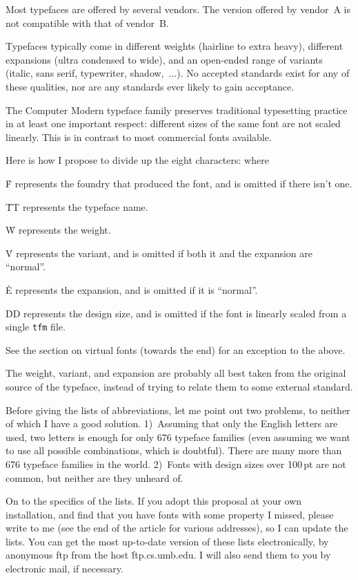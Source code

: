 {\mitem Most typefaces are offered by several vendors.  The version
offered by vendor~A is not compatible with that of vendor~B.

\mitem Typefaces typically come in different weights (hairline to extra
heavy), different expansions (ultra condensed to wide), and an
open-ended range of variants (italic, sans serif, typewriter,
shadow,~$\ldots$).  No accepted standards exist for any of these
qualities, nor are any standards ever likely to gain acceptance.

\mitem The Computer Modern typeface family preserves traditional typesetting
practice in at least one important respect: different sizes of the same
font are not scaled linearly.  This is in contrast to most commercial fonts
available.

Here is how I propose to divide up the eight characters:
\noindent
where

\mitem \.{F} represents the foundry that produced the font, and is omitted
if there isn't one.

\mitem \.{TT} represents the typeface name.

\mitem \.W represents the weight.

\mitem \.V represents the variant, and is omitted if both it and the
expansion are ``normal''.

\mitem \.E represents the expansion, and is omitted if it is ``normal''.

\mitem \.{DD} represents the design size, and is omitted if the font is
linearly scaled from a single {\tt tfm} file.

See the section on virtual fonts (towards the end) for an exception to
the above.

The weight, variant, and expansion are probably all best taken from the
original source of the typeface, instead of trying to relate them to
some external standard.

Before giving the lists of abbreviations, let me point out two problems,
to neither of which I have a good solution.  1)~Assuming that only the
English letters are used, two letters is enough for only 676 typeface
families (even assuming we want to use all possible combinations, which
is doubtful).  There are many more than 676 typeface families in the
world.  2)~Fonts with design sizes over 100$\,$pt are not common, but
neither are they unheard of.

On to the specifics of the lists.  If you adopt this proposal at your
own installation, and find that you have fonts with some property I
missed, please write to me (see the end of the article for various
addresses), so I can update the lists.  You can get the
most up-to-date version of these lists electronically, by anonymous ftp
from the host \.{ftp.cs.umb.edu}.  I will also send them to you by
electronic mail, if necessary.

}
